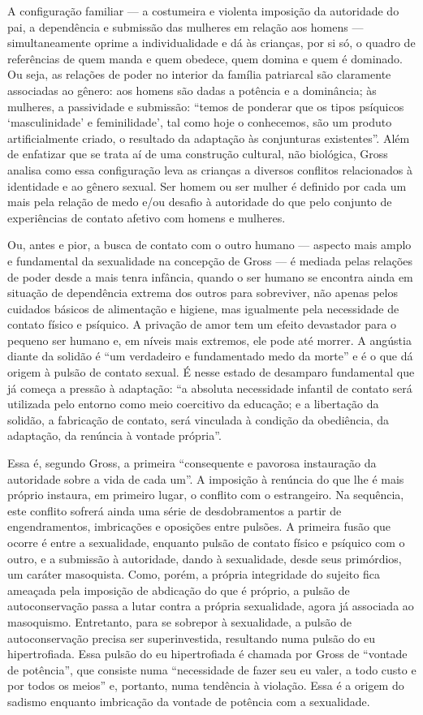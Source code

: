 A configuração familiar --- a costumeira e violenta imposição da
autoridade do pai, a dependência e submissão das mulheres em relação aos
homens --- simultaneamente oprime a individualidade e dá às crianças, por
si só, o quadro de referências de quem manda e quem obedece, quem domina
e quem é dominado. Ou seja, as relações de poder no interior da família
patriarcal são claramente associadas ao gênero: aos homens são dadas a
potência e a dominância; às mulheres, a passividade e submissão: ``temos
de ponderar que os tipos psíquicos `masculinidade' e feminilidade', tal
como hoje o conhecemos, são um produto artificialmente criado, o
resultado da adaptação às conjunturas existentes''. Além de enfatizar
que se trata aí de uma construção cultural, não biológica, Gross analisa
como essa configuração leva as crianças a diversos conflitos
relacionados à identidade e ao gênero sexual. Ser homem ou ser mulher é
definido por cada um mais pela relação de medo e/ou desafio à autoridade
do que pelo conjunto de experiências de contato afetivo com homens e
mulheres.

Ou, antes e pior, a busca de contato com o outro humano --- aspecto mais
amplo e fundamental da sexualidade na concepção de Gross --- é mediada
pelas relações de poder desde a mais tenra infância, quando o ser humano
se encontra ainda em situação de dependência extrema dos outros para
sobreviver, não apenas pelos cuidados básicos de alimentação e higiene,
mas igualmente pela necessidade de contato físico e psíquico. A privação
de amor tem um efeito devastador para o pequeno ser humano e, em níveis
mais extremos, ele pode até morrer. A angústia diante da solidão é ``um
verdadeiro e fundamentado medo da morte'' e é o que dá origem à pulsão
de contato sexual. É nesse estado de desamparo fundamental que já começa
a pressão à adaptação: ``a absoluta necessidade infantil de contato será
utilizada pelo entorno como meio coercitivo da educação; e a libertação
da solidão, a fabricação de contato, será vinculada à condição da
obediência, da adaptação, da renúncia à vontade própria''.

Essa é, segundo Gross, a primeira ``consequente e pavorosa instauração
da autoridade sobre a vida de cada um''. A imposição à renúncia do que
lhe é mais próprio instaura, em primeiro lugar, o conflito com o
estrangeiro. Na sequência, este conflito sofrerá ainda uma série de
desdobramentos a partir de engendramentos, imbricações e oposições entre
pulsões. A primeira fusão que ocorre é entre a sexualidade, enquanto
pulsão de contato físico e psíquico com o outro, e a submissão à
autoridade, dando à sexualidade, desde seus primórdios, um caráter
masoquista. Como, porém, a própria integridade do sujeito fica ameaçada
pela imposição de abdicação do que é próprio, a pulsão de
autoconservação passa a lutar contra a própria sexualidade, agora já
associada ao masoquismo. Entretanto, para se sobrepor à sexualidade, a
pulsão de autoconservação precisa ser superinvestida, resultando numa
pulsão do eu hipertrofiada. Essa pulsão do eu hipertrofiada é chamada
por Gross de ``vontade de potência'', que consiste numa ``necessidade de
fazer seu eu valer, a todo custo e por todos os meios'' e, portanto,
numa tendência à violação. Essa é a origem do sadismo enquanto
imbricação da vontade de potência com a sexualidade.

